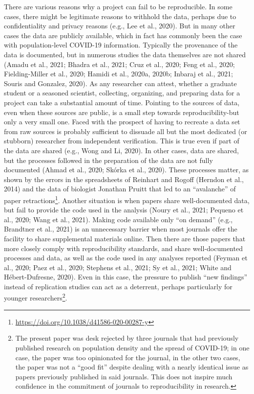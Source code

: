 \documentclass[]{elsarticle} %
\begin{document}
There are various reasons why a project can fail to be reproducible. In
some cases, there might be legitimate reasons to withhold the data,
perhaps due to confidentiality and privacy reasons (e.g., Lee et al.,
2020). But in many other cases the data are publicly available, which in
fact has commonly been the case with population-level COVID-19
information. Typically the provenance of the data is documented, but in
numerous studies the data themselves are not shared (Amadu et al., 2021;
Bhadra et al., 2021; Cruz et al., 2020; Feng et al., 2020;
Fielding-Miller et al., 2020; Hamidi et al., 2020a, 2020b; Inbaraj et
al., 2021; Souris and Gonzalez, 2020). As any researcher can attest,
whether a graduate student or a seasoned scientist, collecting,
organizing, and preparing data for a project can take a substantial
amount of time. Pointing to the sources of data, even when these sources
are public, is a small step towards reproducibility-but only a very
small one. Faced with the prospect of having to recreate a data set from
raw sources is probably sufficient to dissuade all but the most
dedicated (or stubborn) researcher from independent verification. This
is true even if part of the data are shared (e.g., Wong and Li, 2020).
In other cases, data are shared, but the processes followed in the
preparation of the data are not fully documented (Ahmad et al., 2020;
Skórka et al., 2020). These processes matter, as shown by the errors in
the spreadsheets of Reinhart and Rogoff (Herndon et al., 2014) and the
data of biologist Jonathan Pruitt that led to an ``avalanche'' of paper
retractions\footnote{\url{https://doi.org/10.1038/d41586-020-00287-y}}.
Another situation is when papers share well-documented data, but fail to
provide the code used in the analysis (Noury et al., 2021; Pequeno et
al., 2020; Wang et al., 2021). Making code available only ``on demand''
(e.g., Brandtner et al., 2021) is an unnecessary barrier when most
journals offer the facility to share supplemental materials online. Then
there are those papers that more closely comply with reproducibility
standards, and share well-documented processes and data, as well as the
code used in any analyses reported (Feyman et al., 2020; Paez et al.,
2020; Stephens et al., 2021; Sy et al., 2021; White and Hébert-Dufresne,
2020). Even in this case, the pressure to publish ``new findings''
instead of replication studies can act as a deterrent, perhaps
particularly for younger researchers\footnote{The present paper was desk
  rejected by three journals that had previously published research on
  population density and the spread of COVID-19; in one case, the paper
  was too opinionated for the journal, in the other two cases, the paper
  was not a ``good fit'' despite dealing with a nearly identical issue
  as papers previously published in said journals. This does not inspire
  much confidence in the commitment of journals to reproducibility in
  research.}.
\end{document}
